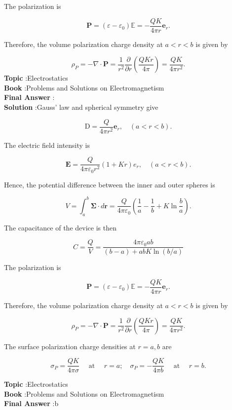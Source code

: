 \documentclass[10pt]{article}
\begin{document}
 The polarization is

$$
\mathbf{P}=\left(\varepsilon-\varepsilon_{0}\right) \mathbb{E}=-\frac{Q K}{4 \pi r} \mathbf{e}_{r} .
$$

Therefore, the volume polarization charge density at $a<r<b$ is given by

$$
\rho_{P}=-\nabla \cdot \mathbf{P}=\frac{1}{r^{2}} \frac{\partial}{\partial r}\left(\frac{Q K r}{4 \pi}\right)=\frac{Q K}{4 \pi r^{2}} .
$$
\textbf{Topic} :Electrostatics\\
\textbf{Book} :Problems and Solutions on Electromagnetism\\
\textbf{Final Answer} :\\


\textbf{Solution} :Gauss' law and spherical symmetry give

$$
\mathrm{D}=\frac{Q}{4 \pi r^{2}} \mathbf{e}_{r}, \quad(a<r<b) .
$$

 The electric field intensity is

$$
\mathbf{E}=\frac{Q}{4 \pi \varepsilon_{0} r^{2}}(1+K r) e_{r}, \quad(a<r<b) .
$$

Hence, the potential difference between the inner and outer spheres is

$$
V=\int_{a}^{b} \mathbf{\Sigma} \cdot d \mathbf{r}=\frac{Q}{4 \pi \varepsilon_{0}}\left(\frac{1}{a}-\frac{1}{b}+K \ln \frac{b}{a}\right) .
$$

The capacitance of the device is then

$$
C=\frac{Q}{V}=\frac{4 \pi \varepsilon_{0} a b}{(b-a)+a b K \ln (b / a)}
$$

 The polarization is

$$
\mathbf{P}=\left(\varepsilon-\varepsilon_{0}\right) \mathbb{E}=-\frac{Q K}{4 \pi r} \mathbf{e}_{r} .
$$

Therefore, the volume polarization charge density at $a<r<b$ is given by

$$
\rho_{P}=-\nabla \cdot \mathbf{P}=\frac{1}{r^{2}} \frac{\partial}{\partial r}\left(\frac{Q K r}{4 \pi}\right)=\frac{Q K}{4 \pi r^{2}} .
$$

 The surface polarization charge densities at $r=a, b$ are

$$
\sigma_{P}=\frac{Q K}{4 \pi \sigma} \quad \text { at } \quad r=a ; \quad \sigma_{P}=-\frac{Q K}{4 \pi b} \quad \text { at } \quad r=b .
$$


\textbf{Topic} :Electrostatics\\
\textbf{Book} :Problems and Solutions on Electromagnetism\\
\textbf{Final Answer} :b\\
\end{document}
